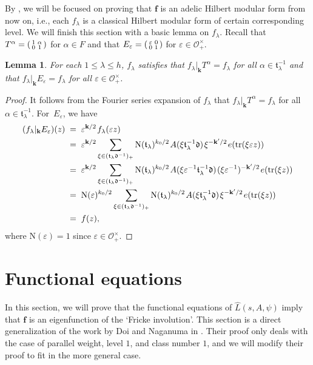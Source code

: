 \documentclass[11pt]{amsart}
\newtheorem{lemma}[theorem]{Lemma}
\theoremstyle{remark}
\newcommand\sm[1]{\begin{psmallmatrix}#1\end{psmallmatrix}}
\newcommand\mbf[1]{\mathbf{#1}}
\newcommand\fr[1]{\mathfrak{#1}}
\newcommand\wh[1]{\widehat{#1}}
\newcommand{\eps}{\varepsilon}
\newcommand{\clo}{\mathcal{O}}
\newcommand{\eq}{\;=\;}
\def\thin{{\hskip 1pt}}
\newcommand{\N}{\mathrm{N}}
\newcommand{\tr}{\mathrm{tr}}
\begin{document}
By , we will be focused on proving that $\mbf{f}$ is an adelic Hilbert modular form from now on, i.e., each $f_\lambda$ is a classical Hilbert modular form of certain corresponding level. We will finish this section with a basic lemma on $f_\lambda$. Recall that $T^\alpha=\sm{1&\alpha\\0&1}$ for $\alpha\in F$ and that $E_\eps=\sm{\eps&0\\0&1}$ for $\eps\in\clo_+^\times$.

\begin{lemma}
\label{basic}
For each $1\leq\lambda\leq h$, $f_\lambda$ satisfies that $f_\lambda|_\mbf{k}T^\alpha=f_\lambda$ for all $\alpha\in\fr{t}_\lambda^{-1}$ and that $f_\lambda|_\mbf{k}E_\eps=f_\lambda$ for all  $\eps\in\clo_+^\times$.
\end{lemma}
\begin{proof}
It follows from the Fourier series expansion of $f_\lambda$ that $f_\lambda|_\mbf{k}T^\alpha=f_\lambda$ for all $\alpha\in\fr{t}_\lambda^{-1}$. For~$E_\eps$, we have
\begin{align*}
    (f_\lambda|_\mbf{k}{E_\eps})(z)&\eq\eps^{\mbf{k}/2}\thin f_\lambda(\eps z) \\
    &\eq\eps^{\mbf{k}/2}\sum_{\xi\in(\fr{t}_\lambda\fr{d}^{-1})_+}\N(\fr{t}_\lambda)^{k_0/2}\thin A(\xi\fr{t}_\lambda^{-1}\fr{d})\thin \xi^{-\mbf{k}^\prime/2}\thin e(\tr(\xi\eps z)) \\
    &\eq\eps^{\mbf{k}/2}\sum_{\xi\in(\fr{t}_\lambda\fr{d}^{-1})_+}\N(\fr{t}_\lambda)^{k_0/2}\thin A(\xi\eps^{-1}\fr{t}_\lambda^{-1}\fr{d})\thin (\xi\eps^{-1})^{-\mbf{k}^\prime/2}\thin e(\tr(\xi z)) \\
    &\eq\N(\eps)^{k_0/2}\sum_{\xi\in(\fr{t}_\lambda\fr{d}^{-1})_+}\N(\fr{t}_\lambda)^{k_0/2}\thin A(\xi\fr{t}_\lambda^{-1}\fr{d})\thin \xi^{-\mbf{k}^\prime/2}\thin e(\tr(\xi z)) \\
    &\eq f(z),
\end{align*}
where $\N(\eps)=1$ since $\eps\in\clo_+^\times$.
\end{proof}

\section{Functional equations}
\label{fqnsection}

In this section, we will prove that the functional equations of $\wh{L}(s,A,\psi)$ imply that $\mbf{f}$ is an eigenfunction of the `Fricke involution'. This section is a direct generalization of the work by Doi and Naganuma in \cite[Section~3]{doinaganuma}. Their proof only deals with the case of parallel weight, level $1$, and class number $1$, and we will modify their proof to fit in the more general case. 
\end{document}
